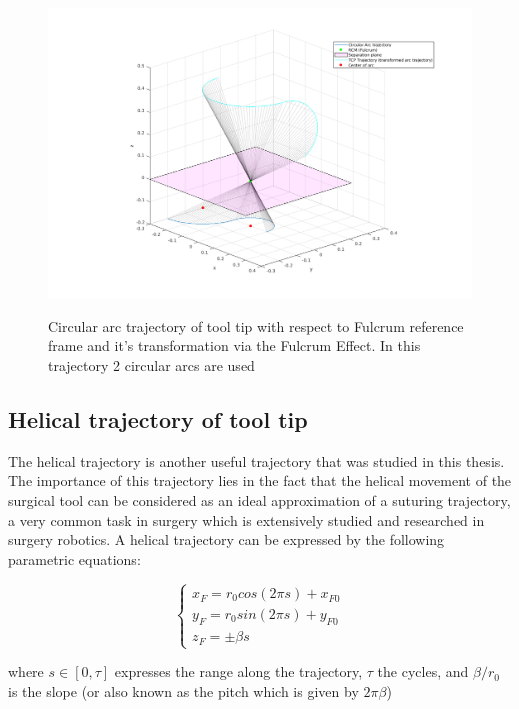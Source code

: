 \begin{center}
\begin{figure}[H]
\centering
\includegraphics[width=\textwidth]{images/rcm_trajectories/rcm_arcs_traj.png}\\
\caption{Circular arc trajectory of tool tip with respect to Fulcrum reference frame and it's transformation via the Fulcrum Effect. In this trajectory 2 circular arcs are used}
\end{figure}
\end{center}

\subsection{Helical trajectory of tool tip}

The helical trajectory is another useful trajectory that was studied in this thesis. The importance of this trajectory lies in the fact that the helical movement of the surgical tool can be considered as an ideal 
approximation of a suturing trajectory, a very common task in surgery which is extensively studied and researched in surgery robotics. A helical trajectory can be expressed by the following parametric equations:

\begin{equation}
\begin{cases}
x^{}_{F} = r_0cos(2πs) + x^{}_{F0} \\
y^{}_{F} = r_0sin(2πs) + y^{}_{F0} \\
z^{}_{F} = \pm βs
\end{cases}
\end{equation}

where $s \in \left[ 0, τ \right]$ expresses the range along the trajectory, $τ$ the cycles, and $β/r_0$ is the slope (or also known as the pitch which is given by $2πβ$)


